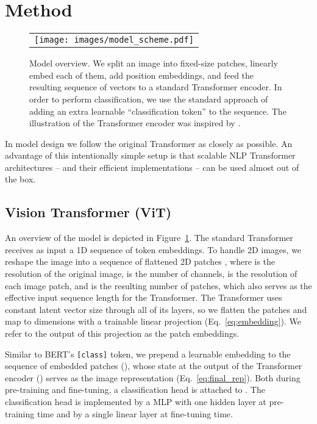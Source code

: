\documentclass{article} \usepackage{iclr2021_conference,times}
\newcommand{\oursabbrv}{ViT\xspace}
\newcommand{\oursfull}{Vision Transformer\xspace}
\begin{document}
 \newcommand{\op}[1]{\operatorname{#1}}
\newcommand{\mbf}[1]{\mathbf{#1}}

\section{Method}

\begin{figure}[h]
\begin{center}
\begin{tabular}{c}
\texttt{[image: images/model\_scheme.pdf]}
\end{tabular}
\end{center}
\caption{Model overview. We split an image into fixed-size patches, linearly embed each of them, add position embeddings, and feed the resulting sequence of vectors to a standard Transformer encoder. In order to perform classification, we use the standard approach of adding an extra learnable ``classification token'' to the sequence. The illustration of the Transformer encoder was inspired by \citet{vaswani2017}.}
\label{fig:model}
\end{figure}

In model design we follow the original Transformer \citep{vaswani2017} as closely as possible. 
An advantage of this intentionally simple setup is that scalable NLP Transformer architectures -- and their efficient implementations -- can be used almost out of the box.

\subsection{\oursfull{} (\oursabbrv{})}\label{sec:patch_transformer}

An overview of the model is depicted in Figure~\ref{fig:model}.
The standard Transformer receives as input a 1D sequence of token embeddings.
To handle 2D images, we reshape the image  into a sequence of flattened 2D patches , where  is the resolution of the original image,  is the number of channels,  is the resolution of each image patch, and  is the resulting number of patches, which also serves as the effective input sequence length for the Transformer.
The Transformer uses constant latent vector size  through all of its layers, so we flatten the patches and map to  dimensions with a trainable linear projection (Eq.~\ref{eq:embedding}).
We refer to the output of this projection as the patch embeddings.

Similar to BERT's \verb|[class]| token, we prepend a learnable embedding to the sequence of embedded patches (), whose state at the output of the Transformer encoder () serves as the image representation  (Eq.~\ref{eq:final_rep}). 
Both during pre-training and fine-tuning, a classification head is attached to .
The classification head is implemented by a MLP with one hidden layer at pre-training time and by a single linear layer at fine-tuning time.
\end{document}
